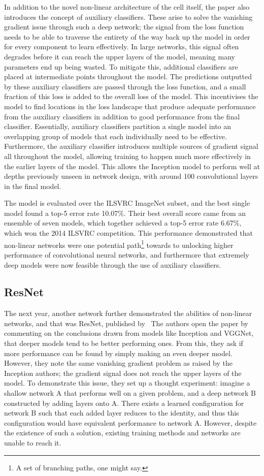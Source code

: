 In addition to the novel non-linear architecture of the cell itself, the paper also introduces the concept of auxiliary
classifiers. These arise to solve the vanishing gradient issue through such a deep network; the signal from the loss
function needs to be able to traverse the entirety of the way back up the model in order for every component to
learn effectively. In large networks, this signal often degrades before it can reach the upper layers of the model,
meaning many parameters end up being wasted. To mitigate this, additional classifiers are placed at intermediate points
throughout the model. The predictions outputted by these auxiliary classifiers are passed through the loss function,
and a small fraction of this loss is added to the overall loss of the model. This incentivises the model to find
locations in the loss landscape that produce adequate performance from the auxiliary classifiers in addition
to good performance from the final classifier. Essentially, auxiliary classifiers partition a single model into an
overlapping group of models that each individually need to be effective. Furthermore, the auxiliary classifier introduces
multiple sources of gradient signal all throughout the model, allowing training to happen much more effectively in the
earlier layers of the model. This allows the Inception model to perform well at depths previously unseen in
network design, with around 100 convolutional layers in the final model.

The model is evaluated over the ILSVRC ImageNet subset, and the best single model found a top-5 error rate 10.07\%. Their
best overall score came from an ensemble of seven models, which together achieved a top-5 error rate 6.67\%, which won the
2014 ILSVRC competition. This performance demonstrated that non-linear networks were one potential path\footnote{A
set of branching paths, one might say.} towards to unlocking
higher performance of convolutional neural networks, and furthermore that extremely deep models were now feasible through
the use of auxiliary classifiers.

\subsection{ResNet}
The next year, another network further demonstrated the abilities of non-linear networks, and that was ResNet, published
by~\citeauthor{he2015} The authors open the paper by commenting
on the conclusions drawn from models like Inception and VGGNet, that deeper models tend to be better performing ones.
From this, they ask if more performance can be found by simply making an even deeper model. However, they note the same
vanishing gradient problem as raised by the Inception authors; the gradient signal does not reach the upper layers of the
model. To demonstrate this issue, they set up a thought experiment: imagine a shallow network A that performs well on a
given problem, and a deep network B constructed by adding layers onto A. There exists a learned configuration for network B
such that each added layer reduces to the identity, and thus this configuration would have equivalent performance to network A. However,
despite the existence of such a solution, existing training methods and networks are unable to reach it.

